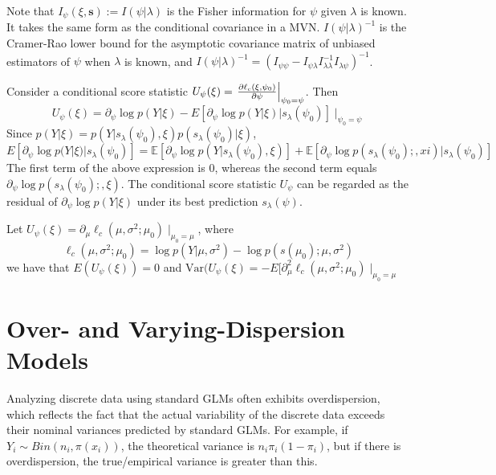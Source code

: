 \documentclass[12pt]{article}
\newcommand{\E}{\mathbb{E}}
\newcommand{\Var}{\mathrm{Var}}
\numberwithin{equation}{section}
\begin{document}
Note that $I_{\psi}(\xi, \mathbf{s}) := I(\psi | \lambda)$ is the Fisher information for $\psi$ given $\lambda$ is known. It takes the same form as the conditional covariance in a MVN. 
$I(\psi | \lambda)^{-1}$ is the Cramer-Rao lower bound for the asymptotic covariance matrix of unbiased estimators of $\psi$ when $\lambda$ is known, and 
$I(\psi | \lambda)^{-1} = (I_{\psi \psi} - I_{\psi \lambda} I_{\lambda \lambda}^{-1} I_{\lambda \psi})^{-1}$.

Consider a conditional score statistic 
$U_{\psi}(\xi) = \left. \pdv{\ell_c(\xi, \psi_0)}{\psi} \right\rvert_{\psi_0 = \psi}$. Then
%
\begin{equation*}
  U_\psi(\xi) = \partial_{\psi} \log{p(Y | \xi)} - E[\partial_{\psi} \log{p(Y | \xi)} | s_{\lambda}(\psi_0)] \mid_{\psi_0 = \psi}
\end{equation*}
%
Since $p(Y | \xi) = p(Y | s_{\lambda}(\psi_0), \xi) 
 p(s_\lambda(\psi_0) | \xi)$,
%
\begin{equation*}
  E[\partial_{\psi} \log{p(Y | \xi) | s_\lambda(\psi_0)}]
    = \E[\partial_{\psi} \log{p(Y | s_{\lambda}(\psi_0), \xi)}] 
      + \E[\partial_{\psi} \log{p(s_{\lambda}(\psi_0);, xi) | s_{\lambda}(\psi_0)}]
\end{equation*}
%
The first term of the above expression is 0, whereas the second term equals $\partial_{\psi} \log p(s_{\lambda}(\psi_0);, \xi)$. The conditional score statistic $U_{\psi}$ can be regarded as the residual of $\partial_{\psi} \log{p(Y | \xi)}$ under its best prediction $s_{\lambda}(\psi)$.

Let $U_{\psi}(\xi) = \partial_{\mu} \ell_{c}(\mu, \sigma^2; \mu_0) \mid_{\mu_0 = \mu}$, where
\begin{equation*}
  \ell_c(\mu, \sigma^2; \mu_0) = \log{p(Y | \mu, \sigma^2)} - \log{p(s(\mu_0); \mu, \sigma^2)}
\end{equation*}
%
we have that $E(U_{\psi}(\xi)) = 0$ and 
$\Var(U_{\psi}(\xi) = -E[\partial_{\mu}^2 \ell_c(\mu, \sigma^2; \mu_0) \mid_{\mu_0 = \mu}$

\section{Over- and Varying-Dispersion Models}
Analyzing discrete data using standard GLMs often exhibits overdispersion, which reflects the fact that the actual variability of the discrete data exceeds their nominal variances predicted by standard GLMs. For example, if $Y_i \sim Bin(n_i, \pi(x_i))$, the theoretical variance is $n_i \pi_i (1 - \pi_i)$, but if there is overdispersion, the true/empirical variance is greater than this. 
\end{document}
